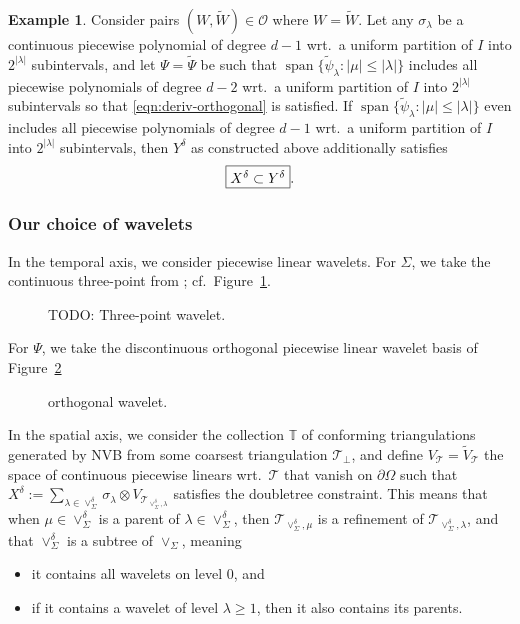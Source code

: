 \documentclass[11pt,a4paper,oneside,english]{amsart}
\numberwithin{equation}{section}
\numberwithin{theorem}{section}
\theoremstyle{definition}
\newtheorem{example}[theorem]{Example}
\DeclareMathOperator{\spann}{span}
\newcommand{\T}{\mathcal{T}}
\newcommand{\jw}[1]{{\color{red}{JW: #1}}}
\begin{document}
\begin{example}
  Consider pairs $(W, \tilde W) \in \mathcal O$ where $W = \tilde W$.
  Let any $\sigma_\lambda$ be a continuous piecewise polynomial of degree $d-1$\jw{voor $d$ de dimensie van je space domain?! of gewoon *een* $d$? in het tweede geval: rename naar $p$?}
  wrt.~a uniform partition of $I$ into $2^{|\lambda|}$ subintervals, and let
  $\Psi=\tilde{\Psi}$ be such that $\spann\{\tilde{\psi}_\lambda : |\mu| \leq |\lambda|\}$
  includes all piecewise polynomials of degree $d-2$ wrt.~a uniform partition
  of $I$ into $2^{|\lambda|}$ subintervals so that \eqref{eqn:deriv-orthogonal}
  is satisfied. If $\spann\{\tilde{\psi}_\lambda : |\mu| \leq |\lambda|\}$ even
  includes all piecewise polynomials of degree $d-1$ wrt.~a uniform partition
  of $I$ into $2^{|\lambda|}$ subintervals, then $Y^\delta$ as constructed above
  additionally satisfies
  \begin{equation}
    \label{eqn:inclusion}
      \framebox{$X^\delta \subset Y^\delta$}.
  \end{equation}
\end{example}

\subsubsection{Our choice of wavelets}
\label{sec:wavelets}
In the temporal axis, we consider piecewise linear wavelets. For $\Sigma$, we take the continuous three-point from \cite{Stevenson1998}; cf.~Figure~\ref{fig:3pt-wavelet}.
\begin{figure}
  \caption{TODO: Three-point wavelet.}
  \label{fig:3pt-wavelet}
\end{figure}

For $\Psi$, we take the discontinuous orthogonal piecewise linear wavelet basis
of Figure~\ref{fig:ortho-wavelet}\jw{again, needs citation; ik kon niks vinden zo 1-2-3;
misschien omdat het niet echt een ``wavelet'' in de typische zin is?}
\begin{figure}
  \caption{orthogonal wavelet.}
  \label{fig:ortho-wavelet}
\end{figure}

In the spatial axis, we consider the collection $\mathbb T$ of conforming
triangulations generated by NVB from some coarsest triangulation $\T_\perp$,
and define $V_\T = \tilde V_\T$ the space of continuous piecewise linears wrt.~$\T$
that vanish on $\partial \Omega$ such that $X^\delta := \sum_{\lambda \in \vee^\delta_\Sigma} \sigma_\lambda \otimes V_{\T_{\vee^\delta_\Sigma, \lambda}}$ satisfies the doubletree constraint.
This means that when $\mu \in \vee^\delta_\Sigma$ is a parent of $\lambda \in \vee^\delta_\Sigma$,
    then $\T_{\vee^\delta_\Sigma, \mu}$ is a refinement of $\T_{\vee^\delta_\Sigma, \lambda}$, and that $\vee^\delta_\Sigma$ is a subtree of $\vee_\Sigma$, meaning
\begin{itemize}
  \item it contains all wavelets on level 0, and
  \item if it contains a wavelet of level $\lambda \geq 1$, then it also contains
    its parents.
\end{itemize}
\end{document}
